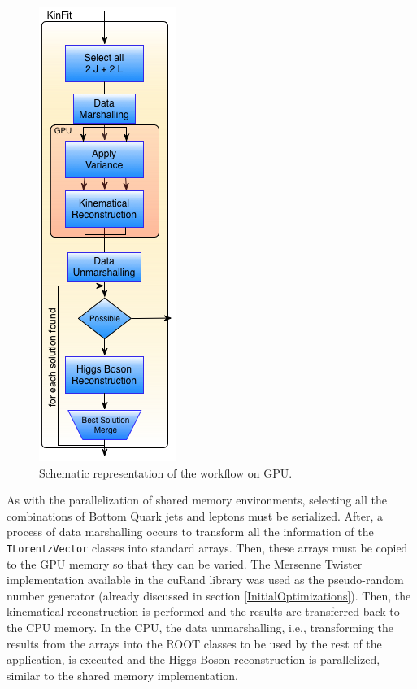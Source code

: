 \begin{figure}[!htp]
	\begin{center}
		\includegraphics[scale=0.5]{../../common/img/gpu_pipeline.png}
		\caption{Schematic representation of the \ttDilepKinFit workflow on GPU.}
		\label{fig:GPUPipeline}
	\end{center}
\end{figure}

As with the parallelization of shared memory environments, selecting all the combinations of Bottom Quark jets and leptons must be serialized. After, a process of data marshalling occurs to transform all the information of the \texttt{TLorentzVector} classes into standard arrays. Then, these arrays must be copied to the GPU memory so that they can be varied. The Mersenne Twister implementation available in the \nvidia cuRand library was used as the pseudo-random number generator (already discussed in section \ref{InitialOptimizations}). Then, the kinematical reconstruction is performed and the results are transferred back to the CPU memory. In the CPU, the data unmarshalling, i.e., transforming the results from the arrays into the ROOT classes to be used by the rest of the application, is executed and the Higgs Boson reconstruction is parallelized, similar to the shared memory implementation.

